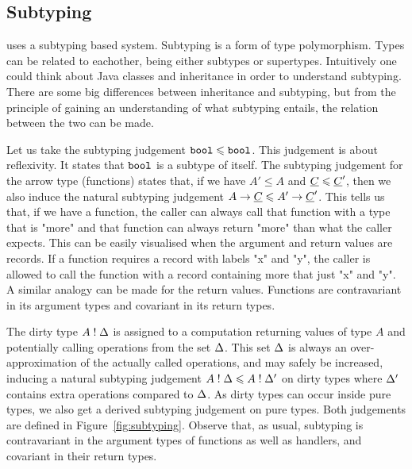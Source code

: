 \subsection{Subtyping}
\eff uses a subtyping based system. Subtyping is a form of type polymorphism. Types can be related to eachother, being either subtypes or supertypes. Intuitively one could think about Java classes and inheritance in order to understand subtyping. There are some big differences between inheritance and subtyping, but from the principle of gaining an understanding of what subtyping entails, the relation between the two can be made. 

Let us take the subtyping judgement $\mathtt{bool} \leqslant \mathtt{bool}$. This judgement is about reflexivity. It states that $\mathtt{bool}$ is a subtype of itself. The subtyping judgement for the arrow type (functions) states that, if we have $A' \le A$ and $\underline{C} \leqslant \underline{C}'$, then we also induce the natural subtyping judgement $A \to \underline{C} \leqslant A' \to \underline{C}'$. This tells us that, if we have a function, the caller can always call that function with a type that is "more" and that function can always return "more" than what the caller expects. This can be easily visualised when the argument and return values are records. If a function requires a record with labels "x" and "y", the caller is allowed to call the function with a record containing more that just "x" and "y". A similar analogy can be made for the return values. Functions are contravariant in its argument types and covariant in its return types.

The dirty type $A \mathrel{!} \Delta$ is assigned to a computation returning values of type $A$ and potentially calling operations from the set $\Delta$. This set $\Delta$ is always an over-approximation of the actually called operations, and may safely be increased, inducing a natural subtyping judgement $A \mathrel{!} \Delta \leqslant A \mathrel{!} \Delta'$ on dirty types where $\Delta'$ contains extra operations compared to $\Delta$. As dirty types can occur inside pure types, we also get a derived subtyping judgement on pure types. Both judgements are defined in Figure~\ref{fig:subtyping}. Observe that, as usual, subtyping is contravariant in the argument types of functions as well as handlers, and covariant in their return types. \cite{inferring}

